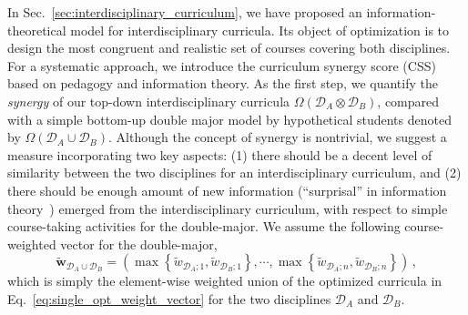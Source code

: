 \documentclass{bmcart}
\begin{document}
In Sec.~\ref{sec:interdisciplinary_curriculum}, we have proposed an information-theoretical model for interdisciplinary curricula. Its object of optimization is to design the most congruent and realistic set of courses covering both disciplines. For a systematic approach, we introduce the curriculum synergy score (CSS) based on pedagogy and information theory. As the first step,
we quantify the \emph{synergy} of our top-down interdisciplinary curricula \( \Omega \left( \mathcal{D}_A \otimes \mathcal{D}_B \right) \), compared with a simple bottom-up double major model by hypothetical students denoted by \( \Omega \left( \mathcal{D}_A \cup \mathcal{D}_B \right) \). Although the concept of synergy is nontrivial, we suggest a measure incorporating two key aspects: (1) there should be a decent level of similarity between the two disciplines for an interdisciplinary curriculum, and (2) there should be enough amount of new information (``surprisal'' in information theory~\cite{Cover2006}) emerged from the interdisciplinary curriculum, with respect to simple course-taking activities for the double-major. We assume the following course-weighted vector for the double-major,
\begin{equation}
\tilde{\mathbf{w}}_{\mathcal{D}_A \cup \mathcal{D}_B} = \left( \max\left\{ \tilde{w}_{\mathcal{D}_A;1}, \tilde{w}_{\mathcal{D}_B;1} \right\}, \cdots , \max\left\{ \tilde{w}_{\mathcal{D}_A;n}, \tilde{w}_{\mathcal{D}_B;n} \right\} \right) \,,
\label{eq:double_major_weighted_vector}
\end{equation}
which is simply the element-wise weighted union of the optimized curricula in Eq.~\eqref{eq:single_opt_weight_vector} for the two disciplines $\mathcal{D}_A$ and $\mathcal{D}_B$. 
\end{document}
